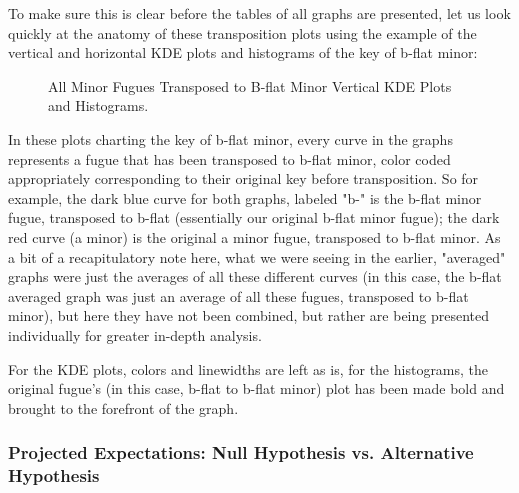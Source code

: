 To make sure this is clear before the tables of all graphs are
presented, let us look quickly at the anatomy of these transposition
plots using the example of the vertical and horizontal KDE plots and
histograms of the key of b-flat minor:


    \begin{center}
    \end{center}
    


\begin{figure}[H]
\vspace{1.5em}
    \centering
    \caption{All Minor Fugues Transposed to B-flat Minor Vertical KDE Plots and Histograms. }
\end{figure}    In these plots charting the key of b-flat minor, every curve in the
graphs represents a fugue that has been transposed to b-flat minor,
color coded appropriately corresponding to their original key before
transposition. So for example, the dark blue curve for both graphs,
labeled "b-" is the b-flat minor fugue, transposed to b-flat
(essentially our original b-flat minor fugue); the dark red curve (a
minor) is the original a minor fugue, transposed to b-flat minor. As a
bit of a recapitulatory note here, what we were seeing in the earlier,
"averaged" graphs were just the averages of all these different curves
(in this case, the b-flat averaged graph was just an average of all
these fugues, transposed to b-flat minor), but here they have not been
combined, but rather are being presented individually for greater
in-depth analysis.

For the KDE plots, colors and linewidths are left as is, for the
histograms, the original fugue's (in this case, b-flat to b-flat minor)
plot has been made bold and brought to the forefront of the graph.

\subsubsection{Projected Expectations: Null Hypothesis vs. Alternative
Hypothesis}\label{projected-expectations-null-hypothesis-vs.-alternative-hypothesis}

